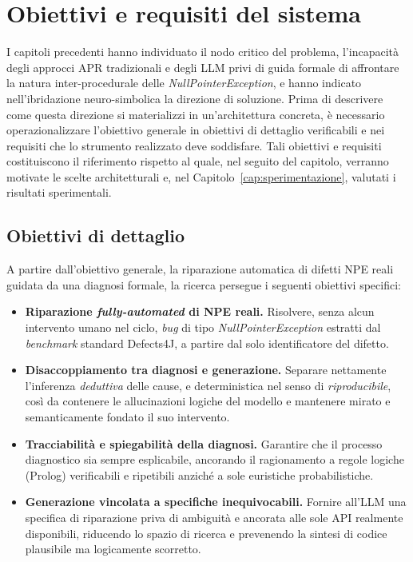 \section{Obiettivi e requisiti del sistema}
\label{sec:obiettivi_requisiti}
I capitoli precedenti hanno individuato il nodo critico del problema, l'incapacità degli approcci
APR tradizionali e degli LLM privi di guida formale di affrontare la natura inter-procedurale delle
\textit{NullPointerException}, e hanno indicato nell'ibridazione neuro-simbolica la direzione di
soluzione. Prima di descrivere come questa direzione si materializzi in un'architettura concreta, è
necessario operazionalizzare l'obiettivo generale in obiettivi di dettaglio verificabili e nei requisiti
che lo strumento realizzato deve soddisfare. Tali obiettivi e requisiti costituiscono il riferimento
rispetto al quale, nel seguito del capitolo, verranno motivate le scelte architetturali e, nel
Capitolo~\ref{cap:sperimentazione}, valutati i risultati sperimentali.

\subsection{Obiettivi di dettaglio}
A partire dall'obiettivo generale, la riparazione automatica di difetti NPE reali guidata da una
diagnosi formale, la ricerca persegue i seguenti obiettivi specifici:
\begin{itemize}
    \item[\textbf{O1}] \textbf{Riparazione \textit{fully-automated} di NPE reali.} Risolvere, senza
    alcun intervento umano nel ciclo, \textit{bug} di tipo \textit{NullPointerException} estratti dal
    \textit{benchmark} standard Defects4J, a partire dal solo identificatore del difetto.
    \item[\textbf{O2}] \textbf{Disaccoppiamento tra diagnosi e generazione.} Separare nettamente
    l'inferenza \emph{deduttiva} delle cause, e deterministica nel senso di \emph{riproducibile}, così da contenere
    le allucinazioni logiche del modello e mantenere mirato e semanticamente fondato il suo intervento.
    \item[\textbf{O3}] \textbf{Tracciabilità e spiegabilità della diagnosi.} Garantire che il processo
    diagnostico sia sempre esplicabile, ancorando il ragionamento a regole logiche (Prolog) verificabili
    e ripetibili anziché a sole euristiche probabilistiche.
    \item[\textbf{O4}] \textbf{Generazione vincolata a specifiche inequivocabili.} Fornire all'LLM una
    specifica di riparazione priva di ambiguità e ancorata alle sole API realmente disponibili,
    riducendo lo spazio di ricerca e prevenendo la sintesi di codice plausibile ma logicamente scorretto.
\end{itemize}

